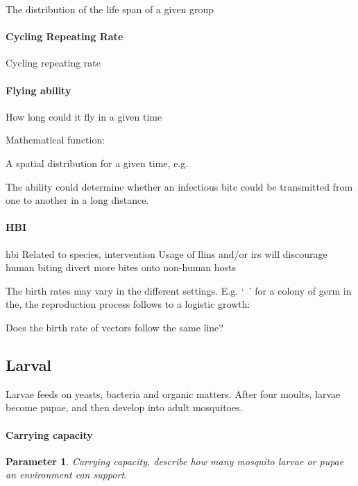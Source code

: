 \documentclass[a4paper, 12pt, twoside]{article}
\newtheorem{parameter}{Parameter}
\begin{document}
The distribution of the life span of a given group

\paragraph{Cycling Repeating Rate}
Cycling repeating rate

\paragraph{Flying ability}
How long could it fly in a given time

Mathematical function:

A spatial distribution for a given time, e.g.

The ability could determine whether an infectious bite could be transmitted from one to another in a long distance.

\paragraph{HBI}
\gls{hbi}
Related to species, intervention
Usage of \gls{llins} and/or \gls{irs} will discourage human biting divert more bites onto non-human hosts

The birth rates may vary in the different settings.
E.g. `\ ' for a colony of germ in the, the reproduction process follows to a logistic growth:

Does the birth rate of vectors follow the same line?

\subsection{Larval}

Larvae feeds on yeasts, bacteria and organic matters.
After four moults, larvae become pupae, and then develop into adult mosquitoes.

\paragraph{Carrying capacity}%
\label{par:carrying_capacity}
\begin{parameter}
	Carrying capacity, describe how many mosquito larvae or pupae an environment can support.
\end{parameter}
\end{document}
